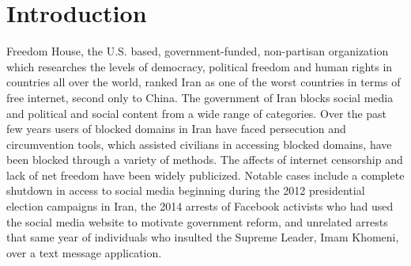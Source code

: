 \section{Introduction}\label{sec:intro}
Freedom House, the U.S. based, government-funded, non-partisan organization which researches the levels of democracy, political freedom and human rights in countries all over the world, ranked Iran as one of the worst countries in terms of free internet, second only to China. The government of Iran blocks social media and political and social content from a wide range of categories. 
	Over the past few years users of blocked domains in Iran have faced persecution and circumvention tools, which assisted civilians in accessing blocked domains, have been blocked through a variety of methods. The affects of internet censorship and lack of net freedom have been widely publicized. Notable cases include a complete shutdown in access to social media beginning during the 2012 presidential election campaigns in Iran, the 2014 arrests of Facebook activists who had used the social media website to motivate government reform, and unrelated arrests that same year of individuals who insulted the Supreme Leader, Imam Khomeni, over a text message application. 
